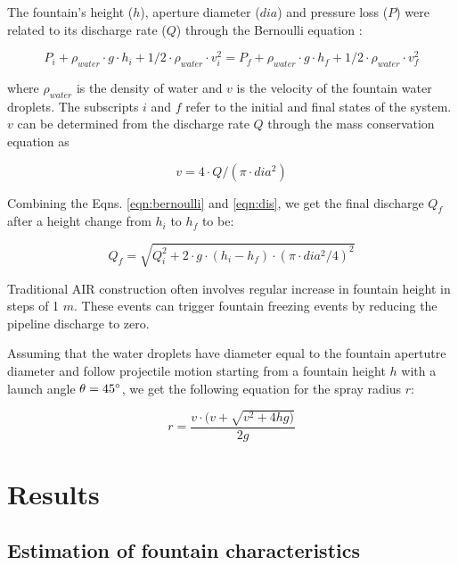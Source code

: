 \documentclass[tc, manuscript]{copernicus}
\begin{document}
The fountain's height ($h$), aperture diameter ($dia$) and pressure loss ($P$) were related to its discharge
rate ($Q$) through the Bernoulli equation :

\begin{equation}
  \label{eqn:bernoulli}
  P_{i} + \rho_{water} \cdot g \cdot h_{i} + 1/2 \cdot \rho_{water} \cdot v_{i}^2 = P_{f} + \rho_{water} \cdot g
  \cdot h_{f} + 1/2 \cdot \rho_{water} \cdot v_{f}^2
\end{equation}

where $\rho_{water}$ is the density of water and $v$ is the velocity of the fountain water droplets. The
subscripts $i$ and $f$ refer to the initial and final states of the system. $v$ can be determined from the
discharge rate $Q$ through the mass conservation equation as 

\begin{equation}
	\label{eqn:dis}
 v = 4 \cdot Q/(\pi \cdot dia^2)
\end{equation}

Combining the Eqns. \ref{eqn:bernoulli} and \ref{eqn:dis}, we get the final discharge $Q_f$ after a height change
from $h_i$ to $h_f$ to be:

\begin{equation}
  \label{eqn:discharge}
  Q_f = \sqrt{Q_i^2 + 2 \cdot g \cdot (h_i-h_f) \cdot (\pi \cdot dia^2/4)^2}
\end{equation}

Traditional AIR construction often involves regular increase in fountain height in steps of 1 $m$. These events
can trigger fountain freezing events by reducing the pipeline discharge to zero.

Assuming that the water droplets have diameter equal to the fountain apertutre diameter and follow projectile
motion starting from a fountain height $h$ with a launch angle $\theta = 45 ^{\circ}$, we get the following
equation for the spray radius $r$:

\begin{equation}
  \label{eqn:radf}
  r = \frac{v \cdot(v + \sqrt{v^2 + 4hg)}}{2g}
\end{equation}

\section{Results}

\subsection{Estimation of fountain characteristics}
\end{document}
